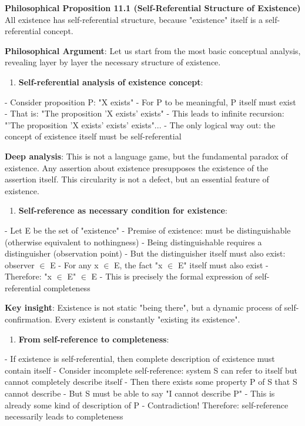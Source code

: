 \textbf{Philosophical Proposition 11.1 (Self-Referential Structure of Existence)}
All existence has self-referential structure, because "existence" itself is a self-referential concept.

\textbf{Philosophical Argument}:
Let us start from the most basic conceptual analysis, revealing layer by layer the necessary structure of existence.

\begin{enumerate}
\item \textbf{Self-referential analysis of existence concept}:
\end{enumerate}
   - Consider proposition P: "X exists"
   - For P to be meaningful, P itself must exist
   - That is: "The proposition 'X exists' exists"
   - This leads to infinite recursion: "'The proposition 'X exists' exists' exists"...
   - The only logical way out: the concept of existence itself must be self-referential
   
   \textbf{Deep analysis}: This is not a language game, but the fundamental paradox of existence.
   Any assertion about existence presupposes the existence of the assertion itself.
   This circularity is not a defect, but an essential feature of existence.

\begin{enumerate}
\item \textbf{Self-reference as necessary condition for existence}:
\end{enumerate}
   - Let E be the set of "existence"
   - Premise of existence: must be distinguishable (otherwise equivalent to nothingness)
   - Being distinguishable requires a distinguisher (observation point)
   - But the distinguisher itself must also exist: observer $\in$ E
   - For any x $\in$ E, the fact "x $\in$ E" itself must also exist
   - Therefore: "x $\in$ E" $\in$ E
   - This is precisely the formal expression of self-referential completeness
   
   \textbf{Key insight}: Existence is not static "being there",
   but a dynamic process of self-confirmation.
   Every existent is constantly "existing its existence".

\begin{enumerate}
\item \textbf{From self-reference to completeness}:
\end{enumerate}
   - If existence is self-referential, then complete description of existence must contain itself
   - Consider incomplete self-reference: system S can refer to itself but cannot completely describe itself
   - Then there exists some property P of S that S cannot describe
   - But S must be able to say "I cannot describe P"
   - This is already some kind of description of P
   - Contradiction! Therefore: self-reference necessarily leads to completeness
   
